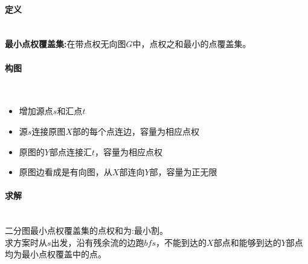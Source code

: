 \paragraph{定义}~{}
\\
\textbf{最小点权覆盖集:}在带点权无向图$G$中，点权之和最小的点覆盖集。

\paragraph{构图}~{}
\\
\begin{itemize}
\item 增加源点$s$和汇点$t$
\item 源$s$连接原图$X$部的每个点连边，容量为相应点权
\item 原图的$Y$部点连接汇$t$，容量为相应点权
\item 原图边看成是有向图，从$X$部连向$Y$部，容量为正无限
\end{itemize}

\paragraph{求解}~{}
\\
二分图最小点权覆盖集的点权和为:最小割。\\
求方案时从$s$出发，沿有残余流的边跑$bfs$，不能到达的$X$部点和能够到达的$Y$部点均为最小点权覆盖中的点。
